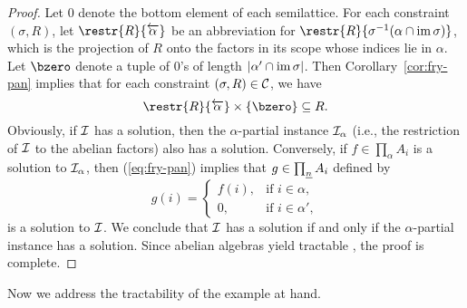 \begin{example}
\begin{proof}
 Let $0$ denote the bottom element of each semilattice.
 For each constraint $(\sigma, R)$,
 let $\restr{R}{\overleftarrow{\alpha}}$ be an abbreviation for 
 $\restr{R}{\sigma^{-1}(\alpha \cap \im \sigma)}$, which is the projection of
 $R$ onto the factors in its scope whose indices lie in $\alpha$.
 Let $\bzero$ denote a tuple of $0$'s of length $|\alpha' \cap \operatorname{im} \sigma|$.
 Then Corollary~\ref{cor:fry-pan} implies that
 for each constraint $(\sigma, R) \in \mathcal{C}$, we have
 \begin{equation}
   \label{eq:fry-pan}
  \restr{R}{\overleftarrow{\alpha}} \times \{\bzero\} \subseteq R.
 \end{equation}
 Obviously, if $\mathcal{I}$ has a solution, then the $\alpha$-partial instance
 $\mathcal{I}_\alpha$ (i.e., the restriction of $\mathcal{I}$ to the abelian factors) also has a solution.
 Conversely, if $f \in \prod_{\alpha}A_i$ is a solution to $\mathcal{I}_\alpha$, then 
 (\ref{eq:fry-pan}) implies that $g \in \prod_{\underline{n}} A_i$ defined by
 \[
   g(i) =
   \begin{cases}
     f(i), & \text{if $i \in \alpha$,} \\
     0, & \text{if $i \in \alpha'$}, 
   \end{cases}
 \]
 is a solution to $\mathcal{I}$.
 We conclude that $\mathcal{I}$ has a solution if and only if the $\alpha$-partial instance
 has a solution.  Since abelian algebras yield tractable \csps, the proof is complete.
\end{proof}

 Now we address the tractability of the example at hand. 
 

\end{example}
